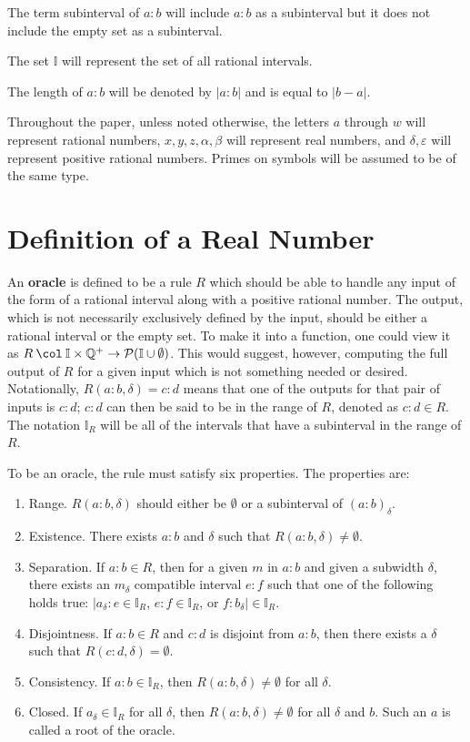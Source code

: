 \documentclass[12pt]{article}
\begin{document}
The term subinterval of $a:b$ will include $a:b$ as a subinterval but it does not include the empty set as a subinterval. 

The set $\mathbb{I}$ will represent the set of all rational intervals. 

The length of $a:b$ will be denoted by $|a:b|$ and is equal to $|b-a|$.

Throughout the paper, unless noted otherwise, the letters $a$ through $w$ will represent rational numbers, $x, y, z, \alpha, \beta$ will represent real numbers, and $\delta, \varepsilon$ will represent positive rational numbers. Primes on symbols will be assumed to be of the same type. 

\section{Definition of a Real Number}

An \textbf{oracle} is defined to be a rule $R$ which should be able to handle any input of the form of a rational interval along with a positive rational number. The output, which is not necessarily exclusively defined by the input, should be either a rational interval or the empty set. To make it into a function, one could view it as $R \mathbin{\col} \mathbb{I} \times \mathbb{Q}^+ \to \mathcal{P}(\mathbb{I} \cup \emptyset)$. This would suggest, however, computing the full output of $R$ for a given input which is not something needed or desired. Notationally, $R(a:b, \delta) = c:d$ means that one of the outputs for that pair of inputs is $c:d$; $c:d$ can then be said to be in the range of $R$, denoted as $c:d \in R$. The notation $\mathbb{I}_R$ will be all of the intervals that have a subinterval in the range of $R$.

To be an oracle, the rule must satisfy six properties.  The properties are:
\begin{enumerate}
    \item Range. $R(a:b, \delta)$ should either be $\emptyset$ or a subinterval of $(a:b)_\delta$. 
    \item Existence. There exists $a:b$ and $\delta$ such that $R(a:b, \delta) \neq \emptyset$.
    \item Separation. 
    If $a:b \in R$, then for a given $m$ in $a:b$ and given a subwidth $\delta$, there exists an $m_\delta$ compatible interval $e:f$ such that one of the following holds true:  $|a_\delta:e \in \mathbb{I}_R$, $e:f \in \mathbb{I}_R$,  or $f:b_{\delta}| \in \mathbb{I}_R$.
   \item Disjointness. If $a:b \in R$ and $c:d$ is disjoint from $a:b$, then there exists a $\delta$ such that $R(c:d, \delta) = \emptyset$.
    \item Consistency. If $a:b  \in \mathbb{I}_R$, then $R(a:b, \delta) \neq \emptyset$ for all $\delta$.
    \item Closed. If $a_\delta \in \mathbb{I}_R$ for all $\delta $, then $R(a:b, \delta) \neq \emptyset$ for all $\delta$ and $b$. Such an $a$ is called a root of the oracle. 
\end{enumerate}
\end{document}
